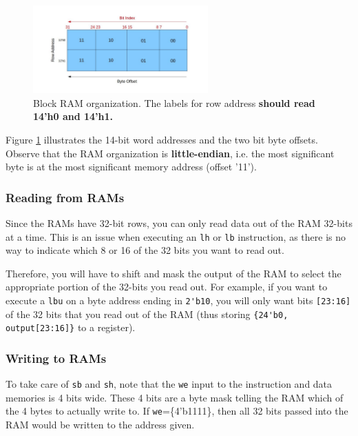 \documentclass[11pt]{article}
\begin{document}
\label{endianness}
\begin{figure}[H]
  \begin{center}
    \includegraphics[width=0.6\textwidth]{endianness_img}
    \caption{Block RAM organization. The labels for row address \textbf{should read 14'h0 and 14'h1.}}
    \label{fig:endianness_img}
  \end{center}
\end{figure}

Figure \ref{fig:endianness_img} illustrates the 14-bit word addresses and the two bit byte offsets.
Observe that the RAM organization is \textbf{little-endian}, i.e. the most significant byte is at the most significant memory address (offset '11').

\subsubsection{Reading from RAMs}
Since the RAMs have 32-bit rows, you can only read data out of the RAM 32-bits at a time.
This is an issue when executing an \verb|lh| or \verb|lb| instruction, as there is no way to indicate which 8 or 16 of the 32 bits you want to read out.

Therefore, you will have to shift and mask the output of the RAM to select the appropriate portion of the 32-bits you read out.
For example, if you want to execute a \verb|lbu| on a byte address ending in \verb|2'b10|, you will only want bits \verb|[23:16]| of the 32 bits that you read out of the RAM (thus storing \verb|{24'b0, output[23:16]}| to a register).

\subsubsection{Writing to RAMs}
To take care of \verb|sb| and \verb|sh|, note that the \verb|we| input to the instruction and data memories is 4 bits wide.
These 4 bits are a byte mask telling the RAM which of the 4 bytes to actually write to.
If \verb|we|=\{4'b1111\}, then all 32 bits passed into the RAM would be written to the address given.
\end{document}
